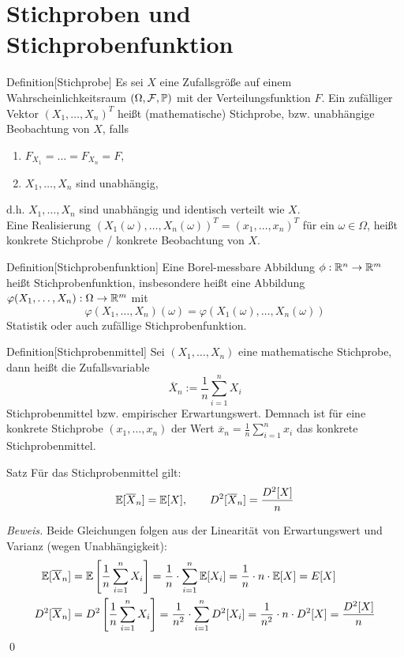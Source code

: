 
\newpage
\section{Stichproben und Stichprobenfunktion}

\begin{colbox}{Definition}[Stichprobe]
    Es sei $X$ eine Zufallsgröße auf einem Wahrscheinlichkeitsraum $(\Omega,\mathcal{F}, \P)$ mit der 
    Verteilungsfunktion $F$. Ein zufälliger Vektor $(X_1,\dots,X_n)^T$ heißt (mathematische) Stichprobe, bzw. unabhängige Beobachtung
    von $X$, falls 
    \begin{enumerate}
        \item $F_{X_1}=\dots=F_{X_n}=F$,
        \item $X_1,\dots,X_n$ sind unabhängig,
    \end{enumerate}
    d.h. $X_1,\dots,X_n$ sind unabhängig und identisch verteilt wie $X$. \\
    Eine Realisierung $(X_1(\omega),\dots,X_n(\omega))^T=(x_1,\dots,x_n)^T$ für ein $\omega\in\Omega$, heißt 
    konkrete Stichprobe / konkrete Beobachtung von $X$.
\end{colbox}

\begin{colbox}{Definition}[Stichprobenfunktion]
    Eine Borel-messbare Abbildung $\phi:\R^n\to\R^m$ heißt Stichprobenfunktion, insbesondere heißt eine 
    Abbildung $\varphi(X_1,\dots,X_n):\Omega\to\R^m$ mit 
    \[
        \varphi(X_1,\dots,X_n)(\omega) = \varphi(X_1(\omega), \dots,X_n(\omega))
    \] Statistik oder auch zufällige
    Stichprobenfunktion.
\end{colbox}

\begin{colbox}{Definition}[Stichprobenmittel]
    Sei $(X_1,\dots,X_n)$ eine mathematische Stichprobe, dann heißt die Zufallsvariable 
    \[
        \overline{X}_n := \dfrac{1}{n}\sum_{i=1}^{n} X_i
    \]
    Stichprobenmittel bzw. empirischer Erwartungswert. Demnach ist für eine konkrete Stichprobe $(x_1,\dots,x_n)$ der 
    Wert $\overline{x}_n = \tfrac{1}{n}\sum_{i=1}^{n}x_i$ das konkrete Stichprobenmittel.
\end{colbox}

\begin{colbox}{Satz}
    Für das Stichprobenmittel gilt:
    \[
        \E[\overline{X}_n] = \E[X], \qquad D^2[\overline{X}_n] = \dfrac{D^2[X]}{n}
    \]
\end{colbox}
\textit{Beweis.} Beide Gleichungen folgen aus der Linearität von Erwartungswert und Varianz (wegen Unabhängigkeit):
\begin{align*}
    \E[\overline{X}_n] 
    &= \E\left[\dfrac{1}{n}\sum_{i=1}^{n} X_i\right] 
    = \dfrac{1}{n}\cdot\sum_{i=1}^{n}\E[X_i] 
    = \dfrac{1}{n}\cdot n\cdot\E[X]
    = E[X] \\
    D^2[\overline{X}_n] 
    &= D^2\left[\dfrac{1}{n}\sum_{i=1}^{n} X_i\right]
    = \dfrac{1}{n^2}\cdot\sum_{i=1}^{n}D^2[X_i]
    = \dfrac{1}{n^2}\cdot n\cdot D^2[X]
    = \dfrac{D^2[X]}{n}
\end{align*}
\qed

